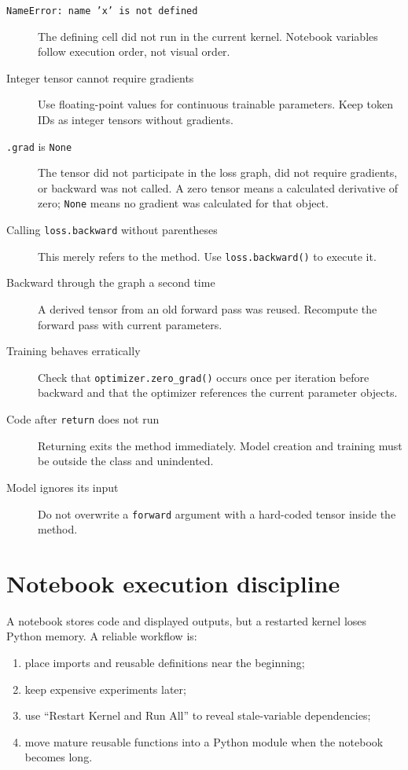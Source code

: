 \documentclass[11pt]{article}
\begin{document}
\begin{description}
\item[\texttt{NameError: name 'x' is not defined}] The defining cell did not run in the current kernel. Notebook
variables follow execution order, not visual order.

\item[Integer tensor cannot require gradients] Use floating-point values for continuous trainable parameters.
Keep token IDs as integer tensors without gradients.

\item[\texttt{.grad} is \texttt{None}] The tensor did not participate in the loss graph, did not require gradients,
or backward was not called. A zero tensor means a calculated derivative of zero; \texttt{None} means no gradient
was calculated for that object.

\item[Calling \texttt{loss.backward} without parentheses] This merely refers to the method. Use
\texttt{loss.backward()} to execute it.

\item[Backward through the graph a second time] A derived tensor from an old forward pass was reused. Recompute
the forward pass with current parameters.

\item[Training behaves erratically] Check that \texttt{optimizer.zero\_grad()} occurs once per iteration before
backward and that the optimizer references the current parameter objects.

\item[Code after \texttt{return} does not run] Returning exits the method immediately. Model creation and training
must be outside the class and unindented.

\item[Model ignores its input] Do not overwrite a \texttt{forward} argument with a hard-coded tensor inside the
method.
\end{description}

\section{Notebook execution discipline}

A notebook stores code and displayed outputs, but a restarted kernel loses Python memory. A reliable workflow is:
\begin{enumerate}
\item place imports and reusable definitions near the beginning;
\item keep expensive experiments later;
\item use ``Restart Kernel and Run All'' to reveal stale-variable dependencies;
\item move mature reusable functions into a Python module when the notebook becomes long.
\end{enumerate}
\end{document}
